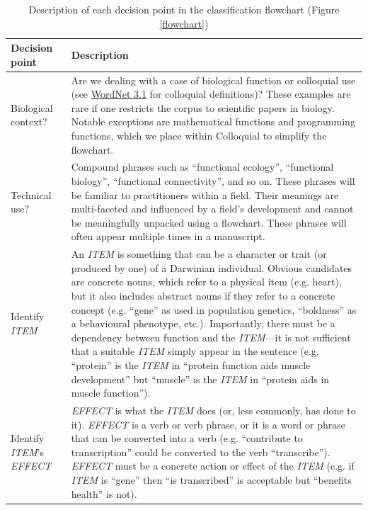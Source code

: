 \documentclass{article}
\begin{document}
\begin{landscape}
  \begin{table}
    \small
    \caption{Description of each decision point in the classification flowchart (Figure \ref{flowchart})}
  \begin{tabular}{|p{0.17\linewidth}|p{0.97\linewidth}|}
    \hline
    Decision point & Description \\
    \hline
    Biological context? & Are we dealing with a case of biological function or colloquial use (see \href{http://wordnetweb.princeton.edu/perl/webwn?s=function&sub=Search+WordNet&o2=&o0=1&o8=1&o1=1&o7=&o5=&o9=&o6=&o3=&o4=&h=}{WordNet 3.1} for colloquial definitions)? These examples are rare if one restricts the corpus to scientific papers in biology. Notable exceptions are mathematical functions and programming functions, which we place within Colloquial to simplify the flowchart. \\
    \hline
    Technical use? & Compound phrases such as ``functional ecology'', ``functional biology'', ``functional connectivity'', and so on. These phrases will be familiar to practitioners within a field. Their meanings are multi-faceted and influenced by a field's development and cannot be meaningfully unpacked using a flowchart.  These phrases will often appear multiple times in a manuscript. \\
    \hline
    Identify \emph{ITEM} &  An \emph{ITEM} is something that can be a character or trait (or produced by one) of a Darwinian individual. Obvious candidates are concrete nouns, which refer to a physical item (e.g. heart), but it also includes abstract nouns if they refer to a concrete concept (e.g. ``gene'' as used in population genetics, ``boldness'' as a behavioural phenotype, etc.). Importantly, there must be a dependency between function and the \emph{ITEM}---it is not sufficient that a suitable \emph{ITEM} simply appear in the sentence (e.g. ``protein'' is the \emph{ITEM} in  ``protein function aids muscle development'' but ``muscle'' is the \emph{ITEM} in ``protein aids in muscle function''). \\
    \hline
    Identify \emph{ITEM}'s \emph{EFFECT} & \emph{EFFECT} is what the \emph{ITEM} does (or, less commonly, has done to it). \emph{EFFECT} is a verb or verb phrase, or it is a word or phrase that can be converted into a verb (e.g. ``contribute to transcription'' could be converted to the verb ``transcribe''). \emph{EFFECT} must be a concrete action or effect of the \emph{ITEM} (e.g. if \emph{ITEM} is ``gene'' then ``is transcribed'' is acceptable but ``benefits health'' is not). \\

\end{tabular}
\end{table}
\end{landscape}
\end{document}
